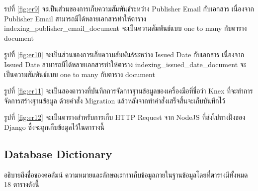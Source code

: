 รปที่ \ref{fig:er9} จะเป็นส่วนของการเก็บความสัมพันธ์ระหว่าง Publisher Email กับเอกสาร เนื่องจาก Publisher Email สามารถมีได้หลายเอกสารทำให้ตาราง indexing\_publisher\_email\_document จะเป็นความสัมพันธ์แบบ one to many กับตาราง document

รูปที่ \ref{fig:er10} จะเป็นส่วนของการเก็บความสัมพันธ์ระหว่าง Issued Date กับเอกสาร เนื่องจาก Issued Date สามารถมีได้หลายเอกสารทำให้ตาราง indexing\_issued\_date\_document จะเป็นความสัมพันธ์แบบ one to many กับตาราง document 

รูปที่ \ref{fig:er11} จะเป็นสองตารางที่บันทึกการจัดการฐานข้อมูลของเครื่องมือที่ชื่อว่า Knex ที่จะทำการจัดการสร้างฐานข้อมูล ด้วยคำสั่ง Migration แล้วหลังจากทำคำสั่งเสร็จสิ้นจะเก็บบันทึกไว้

รูปที่ \ref{fig:er12} จะเป็นตารางสำหรับการเก็บ HTTP Request จาก NodeJS ที่ส่งไปทางฝั่งของ Django ซึ่งจะถูกเก็บข้อมูลไว้ในตารางนี้

\subsection{Database Dictionary}

อธิบายถึงชื่อของคอลัมน์ ความหมายและลักษณะการเก็บข้อมูลภายในฐานข้อมูลโดยที่ตารางมีทั้งหมด 18 ตารางดังนี้




